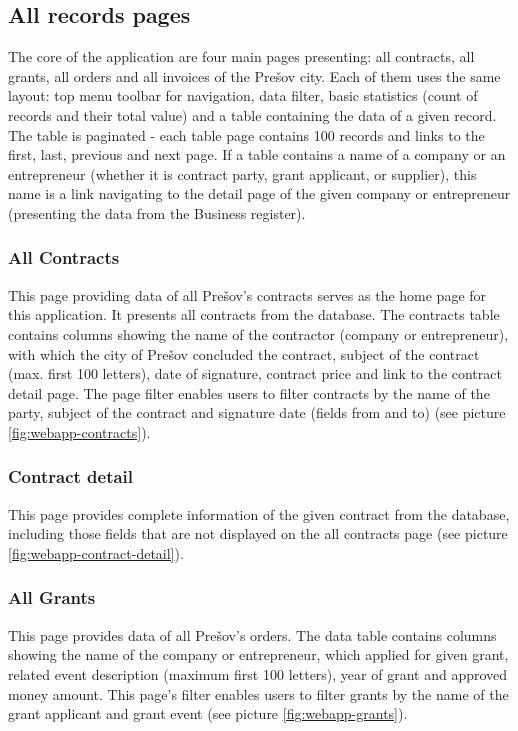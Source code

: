 \documentclass[thesis=B,english]{FITthesis}[2012/06/26]
\begin{document}
	\subsection{All records pages}
The core of the application are four main pages presenting: all contracts, all grants, all orders and all invoices of the Prešov city. Each of them uses the same layout: top menu toolbar for navigation, data filter, basic statistics (count of records and their total value) and a table containing the data of a given record. The table is paginated - each table page contains 100 records and links to the first, last, previous and next page. If a table contains a name of a company or an entrepreneur (whether it is contract party, grant applicant, or supplier), this name is a link navigating to the detail page of the given company or entrepreneur (presenting the data from the Business register).
	\subsubsection{All Contracts}
	This page providing data of all Prešov's contracts serves as the home page for this application. It presents all contracts from the database. The contracts table contains columns showing the name of the contractor (company or entrepreneur), with which the city of Prešov concluded the contract, subject of the contract (max. first 100 letters), date of signature, contract price and link to the contract detail page. The page filter enables users to filter contracts by the name of the party, subject of the contract and signature date (fields from and to) (see picture \ref{fig:webapp-contracts}).


\subsubsection{Contract detail}
	This page provides complete information of the given contract from the database, including those fields that are not displayed on the all contracts page (see picture \ref{fig:webapp-contract-detail}).


\subsubsection{All Grants}
	This page provides data of all Prešov's orders. The data table contains columns showing the name of the company or entrepreneur, which applied for given grant, related event description (maximum first 100 letters), year of grant and approved money amount. This page's filter enables users to filter grants by the name of the grant applicant and grant event (see picture \ref{fig:webapp-grants}).
\end{document}
